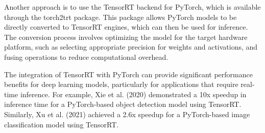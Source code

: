 Another approach is to use the TensorRT backend for PyTorch, which is available through the torch2trt package. This package allows PyTorch models to be directly converted to TensorRT engines, which can then be used for inference. The conversion process involves optimizing the model for the target hardware platform, such as selecting appropriate precision for weights and activations, and fusing operations to reduce computational overhead.

The integration of TensorRT with PyTorch can provide significant performance benefits for deep learning models, particularly for applications that require real-time inference. For example, Xie et al. (2020) demonstrated a 10x speedup in inference time for a PyTorch-based object detection model using TensorRT. Similarly, Xu et al. (2021) achieved a 2.6x speedup for a PyTorch-based image classification model using TensorRT.

